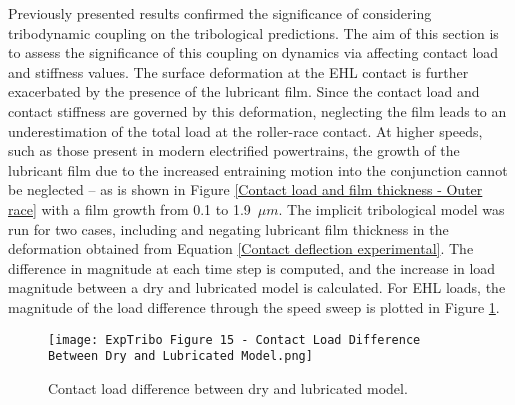 Previously presented results confirmed the significance of considering tribodynamic coupling on the tribological predictions. The aim of this section is to assess the significance of this coupling on dynamics via affecting contact load and stiffness values. The surface deformation at the EHL contact is further exacerbated by the presence of the lubricant film. Since the contact load and contact stiffness are governed by this deformation, neglecting the film leads to an underestimation of the total load at the roller-race contact. At higher speeds, such as those present in modern electrified powertrains, the growth of the lubricant film due to the increased entraining motion into the conjunction cannot be neglected – as is shown in Figure \ref{Contact load and film thickness - Outer race} with a film growth from 0.1 to 1.9~$\mu m$. The implicit tribological model was run for two cases, including and negating lubricant film thickness in the deformation obtained from Equation \ref{Contact deflection experimental}. The difference in magnitude at each time step is computed, and the increase in load magnitude between a dry and lubricated model is calculated. For EHL loads, the magnitude of the load difference through the speed sweep is plotted in Figure \ref{Contact load difference between dry and lubricated model}.

\begin{figure}
	\centering
	\texttt{[image: ExpTribo Figure 15 - Contact Load Difference Between Dry and Lubricated Model.png]}
	\caption{Contact load difference between dry and lubricated model.}
	\label{Contact load difference between dry and lubricated model}
\end{figure} 

